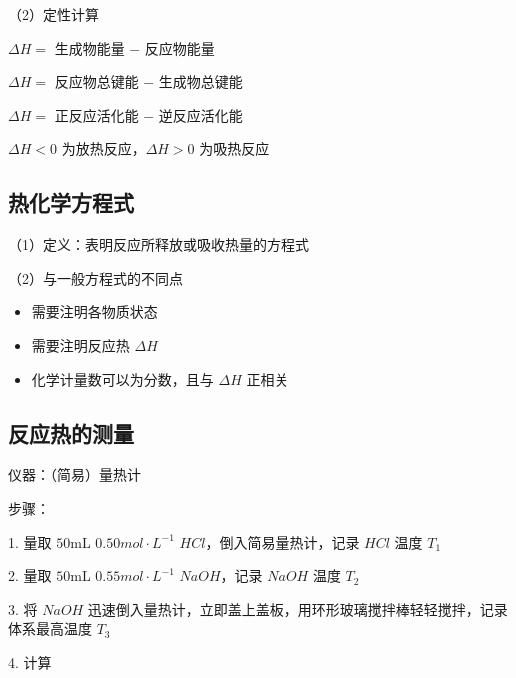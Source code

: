 \documentclass[UTF8,zihao=-4,openany]{ctexbook}
\begin{document}
（2）定性计算\par

$\Delta H=$ 生成物能量 $-$ 反应物能量\par

$\Delta H=$ 反应物总键能 $-$ 生成物总键能\par

$\Delta H=$ 正反应活化能 $-$ 逆反应活化能\par

$\Delta H<0$ 为放热反应，$\Delta H>0$ 为吸热反应\par
\subsection{热化学方程式}
（1）定义：表明反应所释放或吸收热量的方程式\par

（2）与一般方程式的不同点\par

\begin{itemize}
\item 需要注明各物质状态
\end{itemize}

\begin{itemize}
\item 需要注明反应热 $\Delta H$
\end{itemize}

\begin{itemize}
\item 化学计量数可以为分数，且与 $\Delta H$ 正相关
\end{itemize}
\subsection{反应热的测量}
仪器：（简易）量热计\par

步骤：\par

1. 量取 $50$mL $0.50mol\cdot L^{-1}$ $HCl$，倒入简易量热计，记录 $HCl$ 温度 $T_1$\par

2. 量取 $50$mL $0.55mol\cdot L^{-1}$ $NaOH$，记录 $NaOH$ 温度 $T_2$\par

3. 将 $NaOH$ 迅速倒入量热计，立即盖上盖板，用环形玻璃搅拌棒轻轻搅拌，记录体系最高温度 $T_3$\par

4. 计算\par
\end{document}
